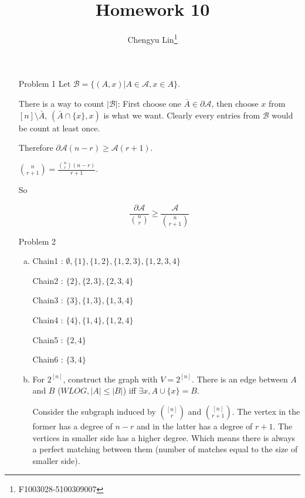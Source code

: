 \documentclass{article}
\title{Homework 10}
\author{Chengyu Lin\footnote{F1003028-5100309007}}
\date{}
\begin{document}
\maketitle

\begin{itemize}
    \item[Problem 1]
        Let $\mathcal{B} = \{(A, x) | A \in \mathcal{A}, x \in A\}$.

        There is a way to count $|\mathcal{B}|$: First choose one
        $\bar{A} \in \partial \mathcal{A}$, then choose $x$ from
        $[n] \setminus \bar{A}$, $(\bar{A} \cap \{x\}, x)$ is what we
        want. Clearly every entries from $\mathcal{B}$ would be count
        at least once.

        Therefore $\partial \mathcal{A} (n - r) \geq \mathcal{A} (r + 1)$.

        ${n \choose r+1} = \frac{{n \choose r} (n - r)}{r + 1}$.

        So

        $$\frac{\partial \mathcal{A}}{{n \choose r}} \geq 
        \frac{\mathcal{A}}{{n \choose r+1}}$$

    \item[Problem 2]
        \begin{enumerate}[(a)]
            \item
                Chain1 : $\emptyset, \{1\}, \{1,2\}, \{1,2,3\}, \{1,2,3,4\}$

                Chain2 : $\{2\}, \{2,3\}, \{2,3,4\}$

                Chain3 : $\{3\}, \{1,3\}, \{1,3,4\}$

                Chain4 : $\{4\}, \{1,4\}, \{1,2,4\}$

                Chain5 : $\{2, 4\}$

                Chain6 : $\{3, 4\}$

            \item
                For $2^{[n]}$, construct the graph with $V = 2^{[n]}$.
                There is an edge between $A$ and $B$ ($WLOG, |A| \le |B|$)
                iff $\exists x, A \cup \{x\} = B$.

                Consider the subgraph induced by ${[n] \choose r}$
                and ${[n] \choose r+1}$. The vertex in the former has
                a degree of $n - r$ and in the latter has a degree
                of $r + 1$. The vertices in smaller side has a higher
                degree. Which means there is always a perfect matching
                between them (number of matches equal to the size of 
                smaller side).


\end{enumerate}
\end{itemize}
\end{document}
